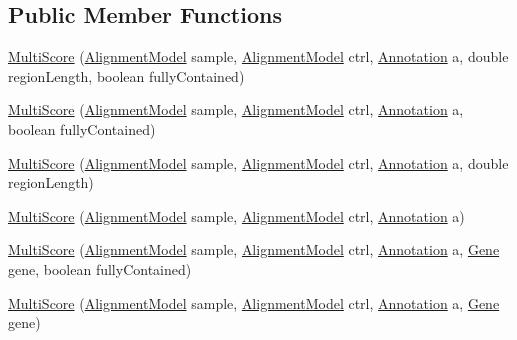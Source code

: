 \subsection*{Public Member Functions}
\begin{DoxyCompactItemize}
\item 
\hyperlink{classumms_1_1core_1_1model_1_1score_1_1_multi_score_a6f2367fd0cfea0843e86e18ed4f46dc9}{Multi\+Score} (\hyperlink{classumms_1_1core_1_1model_1_1_alignment_model}{Alignment\+Model} sample, \hyperlink{classumms_1_1core_1_1model_1_1_alignment_model}{Alignment\+Model} ctrl, \hyperlink{interfaceumms_1_1core_1_1annotation_1_1_annotation}{Annotation} a, double region\+Length, boolean fully\+Contained)
\item 
\hyperlink{classumms_1_1core_1_1model_1_1score_1_1_multi_score_a6033ca816ab9f80d0c87d79071ab942c}{Multi\+Score} (\hyperlink{classumms_1_1core_1_1model_1_1_alignment_model}{Alignment\+Model} sample, \hyperlink{classumms_1_1core_1_1model_1_1_alignment_model}{Alignment\+Model} ctrl, \hyperlink{interfaceumms_1_1core_1_1annotation_1_1_annotation}{Annotation} a, boolean fully\+Contained)
\item 
\hyperlink{classumms_1_1core_1_1model_1_1score_1_1_multi_score_a1b3489523571fe8815bfb8f6c938b425}{Multi\+Score} (\hyperlink{classumms_1_1core_1_1model_1_1_alignment_model}{Alignment\+Model} sample, \hyperlink{classumms_1_1core_1_1model_1_1_alignment_model}{Alignment\+Model} ctrl, \hyperlink{interfaceumms_1_1core_1_1annotation_1_1_annotation}{Annotation} a, double region\+Length)
\item 
\hyperlink{classumms_1_1core_1_1model_1_1score_1_1_multi_score_aa7db2dce5a45e4e40063bdfd91b60897}{Multi\+Score} (\hyperlink{classumms_1_1core_1_1model_1_1_alignment_model}{Alignment\+Model} sample, \hyperlink{classumms_1_1core_1_1model_1_1_alignment_model}{Alignment\+Model} ctrl, \hyperlink{interfaceumms_1_1core_1_1annotation_1_1_annotation}{Annotation} a)
\item 
\hyperlink{classumms_1_1core_1_1model_1_1score_1_1_multi_score_ac2aad63f4611ea9f4832467fd1670c26}{Multi\+Score} (\hyperlink{classumms_1_1core_1_1model_1_1_alignment_model}{Alignment\+Model} sample, \hyperlink{classumms_1_1core_1_1model_1_1_alignment_model}{Alignment\+Model} ctrl, \hyperlink{interfaceumms_1_1core_1_1annotation_1_1_annotation}{Annotation} a, \hyperlink{classumms_1_1core_1_1annotation_1_1_gene}{Gene} gene, boolean fully\+Contained)
\item 
\hyperlink{classumms_1_1core_1_1model_1_1score_1_1_multi_score_aadc8543b5610d1f2d33def42ebf13289}{Multi\+Score} (\hyperlink{classumms_1_1core_1_1model_1_1_alignment_model}{Alignment\+Model} sample, \hyperlink{classumms_1_1core_1_1model_1_1_alignment_model}{Alignment\+Model} ctrl, \hyperlink{interfaceumms_1_1core_1_1annotation_1_1_annotation}{Annotation} a, \hyperlink{classumms_1_1core_1_1annotation_1_1_gene}{Gene} gene)

\end{DoxyCompactItemize}
